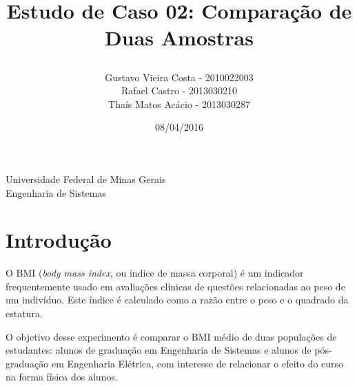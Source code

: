 \documentclass[12pt, a4paper]{article}
\title{
	\begin{large}
		Estudo de Caso 02: Comparação de Duas Amostras
	\end{large}	}
\author{Gustavo Vieira Costa - 2010022003\\Rafael Castro - 2013030210\\Thaís Matos Acácio - 2013030287}
\date{08/04/2016}
\begin{document}
	\maketitle
	
	\vspace*{-7.5cm}
	{\bf
		\begin{center}
			{\large
				\hspace*{0cm}Universidade Federal de Minas Gerais} \\
			\hspace*{0cm}Engenharia de Sistemas  \\
		\end{center}
	}
	\vspace*{5cm}
	
\section{Introdução}
O BMI (\textit{body mass index}, ou índice de massa corporal) é um indicador frequentemente usado em avaliações clínicas de questões relacionadas ao peso de um indivíduo. Este índice é calculado como a razão entre o peso e o quadrado da estatura.
\par O objetivo desse experimento é comparar o BMI médio de duas populações de estudantes: alunos de graduação em Engenharia de Sistemas e alunos de pós-graduação em Engenharia Elétrica, com interesse de relacionar o efeito do curso na forma física dos alunos.
\end{document}
